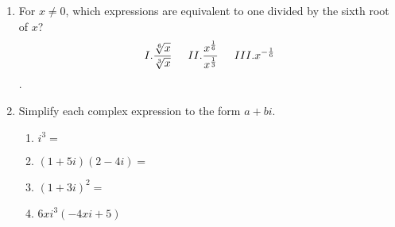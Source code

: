\documentclass[12pt, twoside]{article}
\begin{document}
\begin{enumerate}[itemsep=0.5cm]
\item For $x \ne 0$, which expressions are equivalent to one divided by the sixth root of $x$?
$$\displaystyle I. \frac{\sqrt[6]{x}}{\sqrt[3]{x}} 
\hspace{0.5cm} II. \frac{x^{\frac{1}{6}}}{x^{\frac{1}{3}}} 
\hspace{0.5cm} III. x^{-\frac{1}{6}}$$. \vspace{3cm}

\item Simplify each complex expression to the form $a+bi$.
    \begin{multicols}{2}
    \begin{enumerate}[itemsep=2cm]
        \item $i^3=$
        \item $(1+5i)(2-4i)=$
        \item $(1+3i)^2=$
        \item $6xi^3(-4xi+5)$ %
    \end{enumerate}
    \end{multicols} \vspace{3cm}


\end{enumerate}
\end{document}
